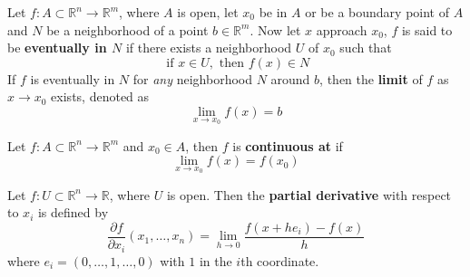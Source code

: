 \documentclass[openany]{book}
\newcommand{\R}{\mathbb{R}}
\begin{document}
\begin{defn}[limit]
    Let $f: A\subset\R^n\to\R^m$, where $A$ is open, let $x_0$ be in $A$ or be a boundary point of $A$ and $N$ be a neighborhood of a point $b\in\R^m$. Now let $x$ approach $x_0$, $f$ is said to be \textbf{eventually in $N$} if there exists a neighborhood $U$ of $x_0$ such that 
    \begin{equation*}
        \text{ if } x\in U, \text{ then } f(x)\in N
    \end{equation*}
    If $f$ is eventually in $N$ for \textit{any} neighborhood $N$ around $b$, then the \textbf{limit} of $f$ as $x\to x_0$ exists, denoted as 
    \begin{equation*}
        \lim_{x\to x_0}f(x)=b
    \end{equation*}
\end{defn}

\begin{defn}[continuous]
    Let $f:A\subset\R^n\to\R^m$ and $x_0\in A$, then $f$ is \textbf{continuous at}  \unboldmath if 
    \begin{equation*}
        \lim_{x\to x_0}f(x)=f(x_0)
    \end{equation*}
\end{defn}


\begin{defn}
    Let $f:U\subset\R^n\to\R$, where $U$ is open. Then the \textbf{partial derivative} with respect to $x_i$ is defined by 
    \begin{equation*}
        \frac{\partial f}{\partial x_i}(x_1, \dots, x_n)=\lim_{h\to 0}\frac{f(x+he_i)-f(x)}{h}
    \end{equation*}
    where $e_i=(0,\dots, 1,\dots, 0)$ with $1$ in the $i$th coordinate. 
\end{defn}
\end{document}
